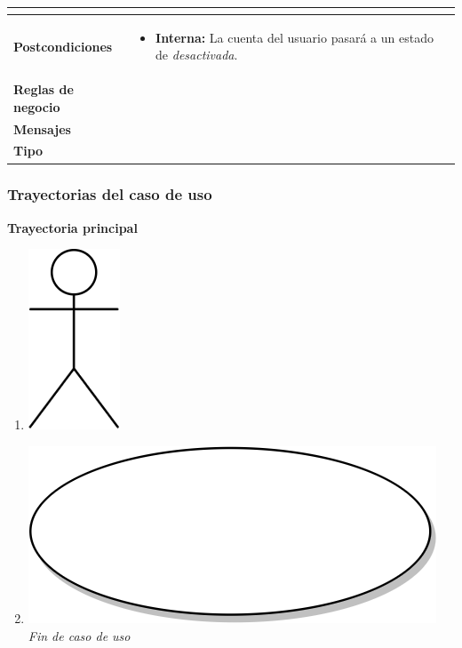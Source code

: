 \begin{center}
\begin{longtable}{| p{3.5cm} | p{11.5cm} |}
\begin{itemize}
	 \end{itemize} \\
        \hline  
          \textbf{Postcondiciones} & 
	\begin{itemize}
              \item \textbf{Interna:} La cuenta del usuario pasará a un estado de \textit{desactivada}.
	\end{itemize} \\
        \hline
          \textbf{Reglas de negocio} & \\
        \hline
          \textbf{Mensajes} & \\
        \hline
          \textbf{Tipo} & \\
        \hline      
  \end{longtable}
\end{center}
\endgroup

\subsubsection{Trayectorias del caso de uso}
\textbf{Trayectoria principal}
\begin{enumerate}
  \item {\includegraphics[scale=.1]{Capitulo3/img/actor.png} }
  \item {\includegraphics[scale=.05]{Capitulo3/img/proceso.png}}
  \textit{Fin de caso de uso} \\  
\end{enumerate}

